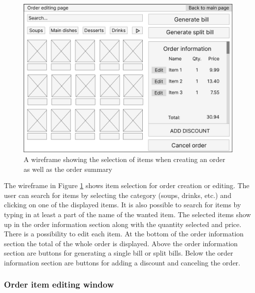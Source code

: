 \documentclass[11pt,a4paper,pdftex]{article}
\begin{document}
\begin{figure}[H]
    \centering
    \includegraphics[width=1\linewidth]{wireframes/OrderItemSelection.png}
    \caption{A wireframe showing the selection of items when creating an order as well as the order summary}
    \label{fig:wireframe_item_selection}
\end{figure}

The wireframe in Figure \ref{fig:wireframe_item_selection} shows item selection for order creation or editing. The user can search for items by selecting the category (soups, drinks, etc.) and clicking on one of the displayed items. It is also possible to search for items by typing in at least a part of the name of the wanted item. The selected items show up in the order information section along with the quantity selected and price. There is a possibility to edit each item. At the bottom of the order information section the total of the whole order is displayed. Above the order information section are buttons for generating a single bill or split bills. Below the order information section are buttons for adding a discount and canceling the order.

\subsubsection{Order item editing window}
\end{document}
